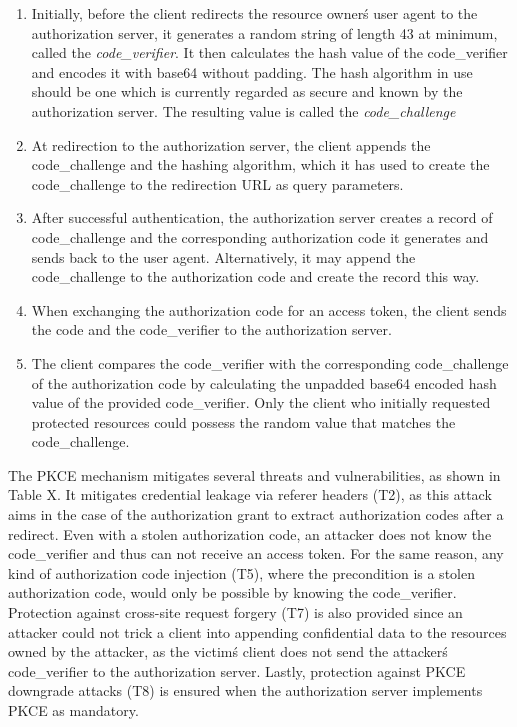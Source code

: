 \documentclass[
    fontsize=12pt,
    headings=small,
    parskip=half,           %
    bibliography=totoc,
    numbers=noenddot,       %
    open=any,               %
    ]{scrreprt}
\begin{document}
\begin{enumerate}
	\item Initially, before the client redirects the resource owner\'s user agent to the authorization server, it generates a random string of length 43 at minimum, called the \emph{code\_verifier}. It then calculates the hash value of the code\_verifier and encodes it with base64 without padding. The hash algorithm in use should be one which is currently regarded as secure and known by the authorization server. The resulting value is called the \emph{code\_challenge}
	
	\item At redirection to the authorization server, the client appends the code\_challenge and the hashing algorithm, which it has used to create the code\_challenge to the redirection URL as query parameters.
	
	\item After successful authentication, the authorization server creates a record of code\_challenge and the corresponding authorization code it generates and sends back to the user agent. Alternatively, it may append the code\_challenge to the authorization code and create the record this way.
	
	\item When exchanging the authorization code for an access token, the client sends the code and the code\_verifier to the authorization server.

	\item The client compares the code\_verifier with the corresponding code\_challenge of the authorization code by calculating the unpadded base64 encoded hash value of the provided code\_verifier. Only the client who initially requested protected resources could possess the random value that matches the code\_challenge.
\end{enumerate}


The PKCE mechanism mitigates several threats and vulnerabilities, as shown in Table X. It mitigates credential leakage via referer headers (T2), as this attack aims in the case of the authorization grant to extract authorization codes after a redirect. Even with a stolen authorization code, an attacker does not know the code\_verifier and thus can not receive an access token. For the same reason, any kind of authorization code injection (T5), where the precondition is a stolen authorization code, would only be possible by knowing the code\_verifier. Protection against cross-site request forgery (T7) is also provided since an attacker could not trick a client into appending confidential data to the resources owned by the attacker, as the victim\'s client does not send the attacker\'s code\_verifier to the authorization server. Lastly, protection against PKCE downgrade attacks (T8) is ensured when the authorization server implements PKCE as mandatory.
\end{document}
